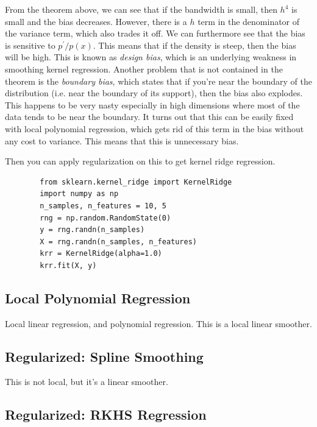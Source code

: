\documentclass{article}
\begin{document}
    From the theorem above, we can see that if the bandwidth is small, then $h^4$ is small and the bias decreases. However, there is a $h$ term in the denominator of the variance term, which also trades it off. We can furthermore see that the bias is sensitive to $p^\prime / p(x)$. This means that if the density is steep, then the bias will be high. This is known as \textit{design bias}, which is an underlying weakness in smoothing kernel regression. Another problem that is not contained in the theorem is the \textit{boundary bias}, which states that if you're near the boundary of the distribution (i.e. near the boundary of its support), then the bias also explodes. This happens to be very nasty especially in high dimensions where most of the data tends to be near the boundary. It turns out that this can be easily fixed with local polynomial regression, which gets rid of this term in the bias without any cost to variance. This means that this is unnecessary bias. 
    
    Then you can apply regularization on this to get kernel ridge regression. 

    \begin{code}
      \begin{lstlisting}
        from sklearn.kernel_ridge import KernelRidge
        import numpy as np
        n_samples, n_features = 10, 5
        rng = np.random.RandomState(0)
        y = rng.randn(n_samples)
        X = rng.randn(n_samples, n_features)
        krr = KernelRidge(alpha=1.0)
        krr.fit(X, y)
      \end{lstlisting}
    \end{code}

  \subsection{Local Polynomial Regression}

    Local linear regression, and polynomial regression. This is a local linear smoother. 

  \subsection{Regularized: Spline Smoothing}

    This is not local, but it's a linear smoother. 

  \subsection{Regularized: RKHS Regression}
\end{document}
